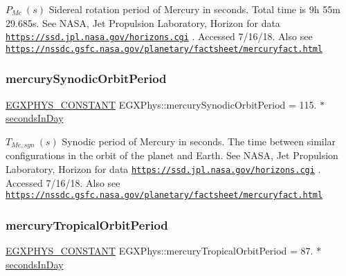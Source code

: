 $ P_{Me} \ (s)$ Sidereal rotation period of Mercury in seconds. Total time is 9h 55m 29.\+685s. See N\+A\+SA, Jet Propulsion Laboratory, Horizon for data \href{https://ssd.jpl.nasa.gov/horizons.cgi}{\tt https\+://ssd.\+jpl.\+nasa.\+gov/horizons.\+cgi} . Accessed 7/16/18. Also see \href{https://nssdc.gsfc.nasa.gov/planetary/factsheet/mercuryfact.html}{\tt https\+://nssdc.\+gsfc.\+nasa.\+gov/planetary/factsheet/mercuryfact.\+html} \mbox{\label{group___e_g_x_phys-_constants-_astrophysics-_solar_system-_mercury-_orbit_gaf0cbddbe7b55b40ccf50b3ba7747ba52}} 
\subsubsection{\texorpdfstring{mercury\+Synodic\+Orbit\+Period}{mercurySynodicOrbitPeriod}}
{\footnotesize\ttfamily \mbox{\hyperlink{group___e_g_x_phys-_constants-_macros_ga76980d288494ce1714c9ac68a95ba702}{E\+G\+X\+P\+H\+Y\+S\+\_\+\+C\+O\+N\+S\+T\+A\+NT}} E\+G\+X\+Phys\+::mercury\+Synodic\+Orbit\+Period = 115. $\ast$ \mbox{\hyperlink{namespace_e_g_x_phys_a93d2a00d75411b58cbf63ab3fd1f8bc2}{seconds\+In\+Day}}}

$ T_{Me,syn} \ (s)$ Synodic period of Mercury in seconds. The time between similar configurations in the orbit of the planet and Earth. See N\+A\+SA, Jet Propulsion Laboratory, Horizon for data \href{https://ssd.jpl.nasa.gov/horizons.cgi}{\tt https\+://ssd.\+jpl.\+nasa.\+gov/horizons.\+cgi} . Accessed 7/16/18. Also see \href{https://nssdc.gsfc.nasa.gov/planetary/factsheet/mercuryfact.html}{\tt https\+://nssdc.\+gsfc.\+nasa.\+gov/planetary/factsheet/mercuryfact.\+html} \mbox{\label{group___e_g_x_phys-_constants-_astrophysics-_solar_system-_mercury-_orbit_ga99b925409a2844db94dcfc8ceae5037a}} 
\subsubsection{\texorpdfstring{mercury\+Tropical\+Orbit\+Period}{mercuryTropicalOrbitPeriod}}
{\footnotesize\ttfamily \mbox{\hyperlink{group___e_g_x_phys-_constants-_macros_ga76980d288494ce1714c9ac68a95ba702}{E\+G\+X\+P\+H\+Y\+S\+\_\+\+C\+O\+N\+S\+T\+A\+NT}} E\+G\+X\+Phys\+::mercury\+Tropical\+Orbit\+Period = 87. $\ast$ \mbox{\hyperlink{namespace_e_g_x_phys_a93d2a00d75411b58cbf63ab3fd1f8bc2}{seconds\+In\+Day}}}

